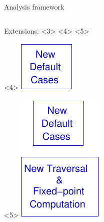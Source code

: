 \begin{frame}[t]{Analysis framework}
\begin{columns}[T]
\begin{column}{6cm}
\begin{onlyenv}
\begin{block}{Extensions: 
            <3>
            <4>
            <5>
          }
\begin{center}
\begin{onlyenv}
            \end{onlyenv}
            \begin{onlyenv}<4>
              \includegraphics{images/analysis_extension2.pdf}
            \end{onlyenv}
            \begin{onlyenv}<5>
              \includegraphics{images/analysis_extension3.pdf}
            \end{onlyenv}
          \end{center}
        \end{block}
      \end{onlyenv}
    \end{column}
  \end{columns}
  
\end{frame}
